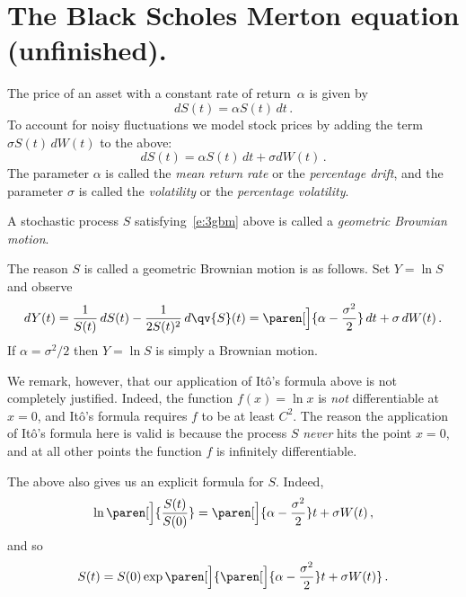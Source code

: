 \section{The Black Scholes Merton equation (unfinished).}

The price of an asset with a constant rate of return~$\alpha$ is given by
\begin{equation*}
  dS(t) = \alpha S(t) \, dt\,.
\end{equation*}
To account for noisy fluctuations we model stock prices by adding the term $\sigma S(t) \, dW(t)$ to the above:
\begin{equation}\label{e:3gbm}
  dS(t) = \alpha S(t) \, dt + \sigma dW(t)\,.
\end{equation}
The parameter $\alpha$ is called the \emph{mean return rate} or the \emph{percentage drift}, and the parameter $\sigma$ is called the \emph{volatility} or the \emph{percentage volatility}.

\begin{definition}
  A stochastic process $S$ satisfying~\eqref{e:3gbm} above is called a \emph{geometric Brownian motion}.
\end{definition}

The reason $S$ is called a geometric Brownian motion is as follows.
Set $Y = \ln S$ and observe
\begin{equation*}
  dY(t) = \frac{1}{S(t)} \, dS(t) - \frac{1}{2 S(t)^2} \, d\qv{S}(t)
    = \paren[\Big]{\alpha - \frac{\sigma^2}{2}} \, dt + \sigma \, dW(t)\,.
\end{equation*}
If $\alpha = \sigma^2/2$ then $Y = \ln S$ is simply a Brownian motion.

We remark, however, that our application of It\^o's formula above is not completely justified.
Indeed, the function $f(x) = \ln x$ is \emph{not} differentiable at $x = 0$, and It\^o's formula requires $f$ to be at least $C^2$.
The reason the application of It\^o's formula here is valid is because the process $S$ \emph{never} hits the point $x = 0$, and at all other points the function $f$ is infinitely differentiable.

The above also gives us an explicit formula for $S$.
Indeed,
\begin{equation*}
  \ln\paren[\Big]{ \frac{S(t)}{S(0)} }
    = \paren[\Big]{\alpha - \frac{\sigma^2}{2}} t + \sigma W(t)\,,
\end{equation*}
and so
\begin{equation}\label{e:3gbmFor}
  S(t) = S(0) \exp\paren[\Big]{
    \paren[\Big]{\alpha - \frac{\sigma^2}{2}} t + \sigma W(t)
  }\,.
\end{equation}

